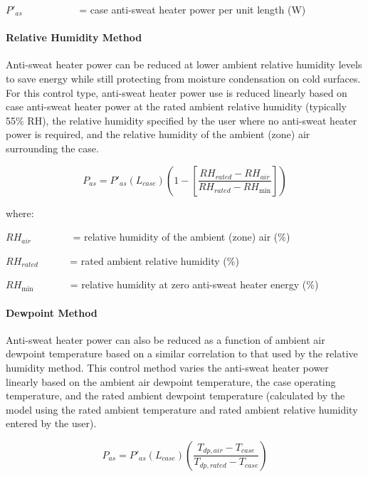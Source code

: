 \({P'}_{as}\) ~~~~~~~~~~ = case anti-sweat heater power per unit length (W)

\paragraph{Relative Humidity Method}\label{relative-humidity-method}

Anti-sweat heater power can be reduced at lower ambient relative humidity levels to save energy while still protecting from moisture condensation on cold surfaces. For this control type, anti-sweat heater power use is reduced linearly based on case anti-sweat heater power at the rated ambient relative humidity (typically 55\% RH), the relative humidity specified by the user where no anti-sweat heater power is required, and the relative humidity of the ambient (zone) air surrounding the case.

\begin{equation}
{P_{as}} = {P'}_{as}\left( {{L_{case}}} \right)\left( {1 - \left[ {\frac{{R{H_{rated}} - R{H_{air}}}}{{R{H_{rated}} - R{H_{\min }}}}} \right]} \right)
\end{equation}

where:

\(R{H_{air}}\) ~~~~~~~ = relative humidity of the ambient (zone) air (\%)

\(R{H_{rated}}\) ~~~~~ = rated ambient relative humidity (\%)

\(R{H_{\min }}\) ~~~~~~ = relative humidity at zero anti-sweat heater energy (\%)

\paragraph{Dewpoint Method}\label{dewpoint-method}

Anti-sweat heater power can also be reduced as a function of ambient air dewpoint temperature based on a similar correlation to that used by the relative humidity method. This control method varies the anti-sweat heater power linearly based on the ambient air dewpoint temperature, the case operating temperature, and the rated ambient dewpoint temperature (calculated by the model using the rated ambient temperature and rated ambient relative humidity entered by the user).

\begin{equation}
{P_{as}} = {P'}_{as}\left( {{L_{case}}} \right)\left( {\frac{{{T_{dp,air}} - {T_{case}}}}{{{T_{dp,rated}} - {T_{case}}}}} \right)
\end{equation}

